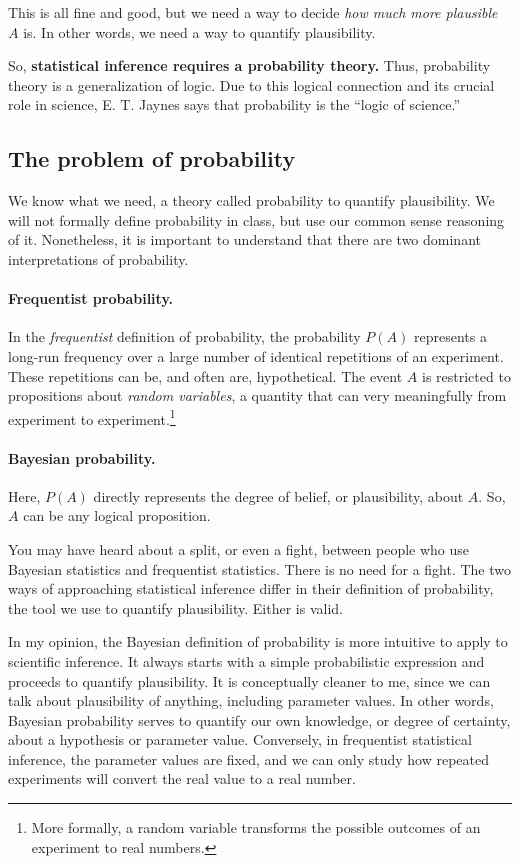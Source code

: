 This is all fine and good, but we need a way to decide \textit{how
  much more plausible} $A$ is.  In other words, we need a way to
quantify plausibility.

So, \textbf{statistical inference requires a probability theory.}
Thus, probability theory is a generalization of logic.  Due to this
logical connection and its crucial role in science, E. T. Jaynes says
that probability is the ``logic of science.''


\subsection{The problem of probability}
We know what we need, a theory called probability to quantify
plausibility.  We will not formally define probability in class, but
use our common sense reasoning of it.  Nonetheless, it is important to
understand that there are two dominant interpretations of probability.

\paragraph{Frequentist probability.}  In the \textit{frequentist}
definition of probability, the probability $P(A)$ represents a
long-run frequency over a large number of identical repetitions of an
experiment.  These repetitions can be, and often are, hypothetical.
The event $A$ is restricted to propositions about \textit{random
  variables}, a quantity that can very meaningfully from experiment to
experiment.\footnote{More formally, a random variable transforms the
  possible outcomes of an experiment to real numbers.}

\paragraph{Bayesian probability.} Here, $P(A)$ directly represents the
degree of belief, or plausibility, about $A$.  So, $A$ can be any
logical proposition.

You may have heard about a split, or even a fight, between people who
use Bayesian statistics and frequentist statistics.  There is no need
for a fight.  The two ways of approaching statistical inference differ
in their definition of probability, the tool we use to quantify
plausibility.  Either is valid.

In my opinion, the Bayesian definition of probability is more
intuitive to apply to scientific inference.  It always starts with a
simple probabilistic expression and proceeds to quantify plausibility.
It is conceptually cleaner to me, since we can talk about plausibility
of anything, including parameter values.  In other words, Bayesian
probability serves to quantify our own knowledge, or degree of
certainty, about a hypothesis or parameter value.  Conversely, in
frequentist statistical inference, the parameter values are fixed, and
we can only study how repeated experiments will convert the real value
to a real number.

